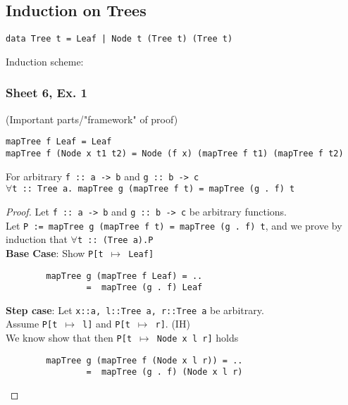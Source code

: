 \documentclass[11.5pt]{article}
\begin{document}
\subsection{Induction on Trees}
\begin{verbatim}
data Tree t = Leaf | Node t (Tree t) (Tree t)
\end{verbatim}

Induction scheme:
\begin{prooftree}
\end{prooftree}

\subsubsection{Sheet 6, Ex. 1}
(Important parts/"framework" of proof) 
\begin{verbatim}
mapTree f Leaf = Leaf
mapTree f (Node x t1 t2) = Node (f x) (mapTree f t1) (mapTree f t2) 
\end{verbatim}  
For arbitrary \texttt{f :: a -> b} and \texttt{g :: b -> c} \\
$\forall$\texttt{t :: Tree a. mapTree g (mapTree f t) = mapTree (g . f) t}

\begin{proof}
    Let \texttt{f :: a -> b} and \texttt{g :: b -> c} be arbitrary functions. \\
    Let \texttt{P := mapTree g (mapTree f t) = mapTree (g . f) t}, and we prove by induction that 
    $\forall$\texttt{t :: (Tree a).P} \\
    \textbf{Base Case}: Show \texttt{P[t $\mapsto$ Leaf]} 
    \begin{verbatim}
        mapTree g (mapTree f Leaf) = ..
                =  mapTree (g . f) Leaf
    \end{verbatim}
    \textbf{Step case}: 
    Let \texttt{x::a, l::Tree a, r::Tree a} be arbitrary. \\
    Assume \texttt{P[t $\mapsto$ l]} and \texttt{P[t $\mapsto$ r]}. (IH) \\
    We know show that then \texttt{P[t $\mapsto$ Node x l r]} holds 
    \begin{verbatim}
        mapTree g (mapTree f (Node x l r)) = ..
                =  mapTree (g . f) (Node x l r)
    \end{verbatim}
\end{proof}
\end{document}
